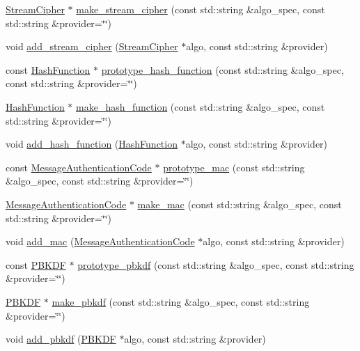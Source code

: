 \begin{DoxyCompactItemize}
\item 
\hyperlink{classBotan_1_1StreamCipher}{Stream\-Cipher} $\ast$ \hyperlink{classBotan_1_1Algorithm__Factory_a0e34fa28cec72ec79accbd2ffe668ee3}{make\-\_\-stream\-\_\-cipher} (const std\-::string \&algo\-\_\-spec, const std\-::string \&provider=\char`\"{}\char`\"{})
\item 
void \hyperlink{classBotan_1_1Algorithm__Factory_a89b61ed1eb5e3626dafca1a55e4a217f}{add\-\_\-stream\-\_\-cipher} (\hyperlink{classBotan_1_1StreamCipher}{Stream\-Cipher} $\ast$algo, const std\-::string \&provider)
\item 
const \hyperlink{classBotan_1_1HashFunction}{Hash\-Function} $\ast$ \hyperlink{classBotan_1_1Algorithm__Factory_a4b88ea4726cf0020fd4aa843f5339d39}{prototype\-\_\-hash\-\_\-function} (const std\-::string \&algo\-\_\-spec, const std\-::string \&provider=\char`\"{}\char`\"{})
\item 
\hyperlink{classBotan_1_1HashFunction}{Hash\-Function} $\ast$ \hyperlink{classBotan_1_1Algorithm__Factory_a6c5fb62e2171b775cfe6de6dd9a6a9e8}{make\-\_\-hash\-\_\-function} (const std\-::string \&algo\-\_\-spec, const std\-::string \&provider=\char`\"{}\char`\"{})
\item 
void \hyperlink{classBotan_1_1Algorithm__Factory_a0ed0ff670735fc312113e2e84c030999}{add\-\_\-hash\-\_\-function} (\hyperlink{classBotan_1_1HashFunction}{Hash\-Function} $\ast$algo, const std\-::string \&provider)
\item 
const \hyperlink{classBotan_1_1MessageAuthenticationCode}{Message\-Authentication\-Code} $\ast$ \hyperlink{classBotan_1_1Algorithm__Factory_aab26a652b7e0afe11ffd3194670f0f6a}{prototype\-\_\-mac} (const std\-::string \&algo\-\_\-spec, const std\-::string \&provider=\char`\"{}\char`\"{})
\item 
\hyperlink{classBotan_1_1MessageAuthenticationCode}{Message\-Authentication\-Code} $\ast$ \hyperlink{classBotan_1_1Algorithm__Factory_aa3952fbe10367252e97fcd2cb45e3c72}{make\-\_\-mac} (const std\-::string \&algo\-\_\-spec, const std\-::string \&provider=\char`\"{}\char`\"{})
\item 
void \hyperlink{classBotan_1_1Algorithm__Factory_a6d0a8697ae96af687dafbe476c6e522d}{add\-\_\-mac} (\hyperlink{classBotan_1_1MessageAuthenticationCode}{Message\-Authentication\-Code} $\ast$algo, const std\-::string \&provider)
\item 
const \hyperlink{classBotan_1_1PBKDF}{P\-B\-K\-D\-F} $\ast$ \hyperlink{classBotan_1_1Algorithm__Factory_ac3975290561e670f54fb832c893cb083}{prototype\-\_\-pbkdf} (const std\-::string \&algo\-\_\-spec, const std\-::string \&provider=\char`\"{}\char`\"{})
\item 
\hyperlink{classBotan_1_1PBKDF}{P\-B\-K\-D\-F} $\ast$ \hyperlink{classBotan_1_1Algorithm__Factory_a33107b044fd2c2def7518539a122c293}{make\-\_\-pbkdf} (const std\-::string \&algo\-\_\-spec, const std\-::string \&provider=\char`\"{}\char`\"{})
\item 
void \hyperlink{classBotan_1_1Algorithm__Factory_a7d341efe1e6cd21cee3b07d65e9078a0}{add\-\_\-pbkdf} (\hyperlink{classBotan_1_1PBKDF}{P\-B\-K\-D\-F} $\ast$algo, const std\-::string \&provider)
\end{DoxyCompactItemize}
